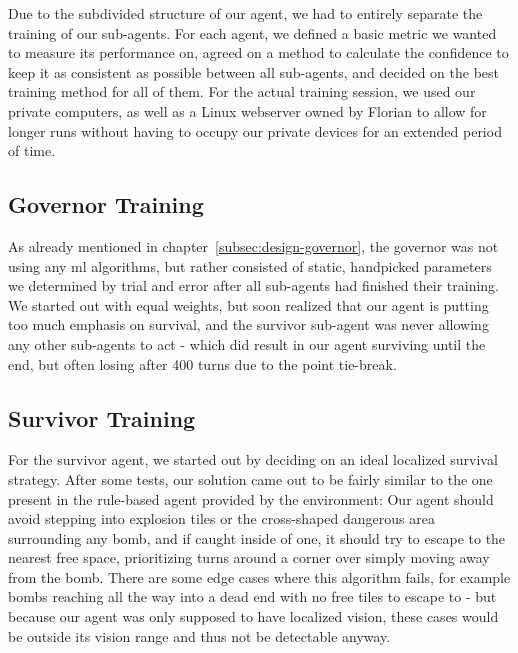 Due to the subdivided structure of our agent, we had to entirely separate the training of our sub-agents.
For each agent, we defined a basic metric we wanted to measure its performance on, agreed on a method to calculate the
confidence to keep it as consistent as possible between all sub-agents, and decided on the best training method for all
of them.
For the actual training session, we used our private computers, as well as a Linux webserver owned by Florian to allow
for longer runs without having to occupy our private devices for an extended period of time.

\subsection{Governor Training}
\label{subsec:training-governor}
As already mentioned in chapter~\ref{subsec:design-governor}, the governor was not using any \gls{ml} algorithms, but
rather consisted of static, handpicked parameters we determined by trial and error after all sub-agents had finished
their training.
We started out with equal weights, but soon realized that our agent is putting too much emphasis on survival, and the
survivor sub-agent was never allowing any other sub-agents to act - which did result in our agent surviving until the
end, but often losing after 400 turns due to the point tie-break.

\subsection{Survivor Training}
\label{subsec:training-survivor}
For the survivor agent, we started out by deciding on an ideal localized survival strategy.
After some tests, our solution came out to be fairly similar to the one present in the rule-based agent provided by the
environment:
Our agent should avoid stepping into explosion tiles or the cross-shaped dangerous area surrounding any bomb, and if
caught inside of one, it should try to escape to the nearest free space, prioritizing turns around a corner over simply
moving away from the bomb.
There are some edge cases where this algorithm fails, for example bombs reaching all the way into a dead end with no
free tiles to escape to - but because our agent was only supposed to have localized vision, these cases would be outside
its vision range and thus not be detectable anyway.

